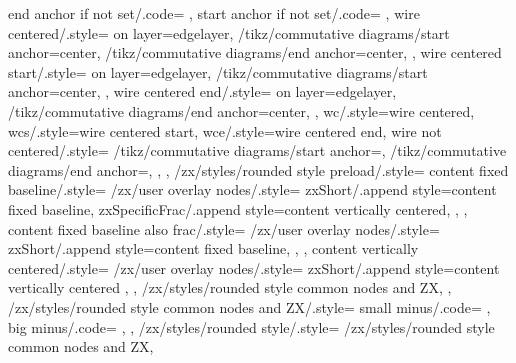 {{    %
    end anchor if not set/.code={%
      \ifx\tikzcd@endanchor\pgfutil@empty%
      \fi%
    },
    start anchor if not set/.code={%
      \ifx\tikzcd@startanchor\pgfutil@empty%
      \fi%
    },
    wire centered/.style={
      on layer=edgelayer,
      /tikz/commutative diagrams/start anchor=center,
      /tikz/commutative diagrams/end anchor=center,
    },
    wire centered start/.style={
      on layer=edgelayer,
      /tikz/commutative diagrams/start anchor=center,
    },
    wire centered end/.style={
      on layer=edgelayer,
      /tikz/commutative diagrams/end anchor=center,
    },
    wc/.style={wire centered},
    wcs/.style={wire centered start},
    wce/.style={wire centered end},
    wire not centered/.style={
      /tikz/commutative diagrams/start anchor=,
      /tikz/commutative diagrams/end anchor=,
    },
  },
  /zx/styles/rounded style preload/.style={
    content fixed baseline/.style={
      /zx/user overlay nodes/.style={
        zxShort/.append style={content fixed baseline},
        zxSpecificFrac/.append style={content vertically centered},
      },
    },
    content fixed baseline also frac/.style={
      /zx/user overlay nodes/.style={
        zxShort/.append style={content fixed baseline},
      },
    },
    content vertically centered/.style={
      /zx/user overlay nodes/.style={
        zxShort/.append style={content vertically centered}
      },
    },
    /zx/styles/rounded style common nodes and ZX,
  },
  /zx/styles/rounded style common nodes and ZX/.style={
    small minus/.code={
      \def\zxMinus{\zxShortMinus}%
      \def\zxMinusInShort{\zxShortMinus}%
    },
    big minus/.code={
      \def\zxMinus{-}%
      \def\zxMinusInShort{-}%
    },
  },
  /zx/styles/rounded style/.style={
    /zx/styles/rounded style common nodes and ZX,
}}
